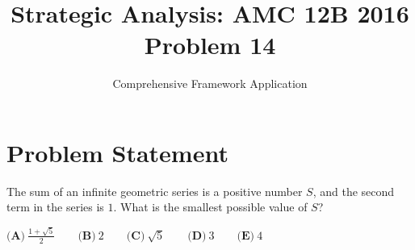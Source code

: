 \documentclass[12pt]{article}
\title{Strategic Analysis: AMC 12B 2016 Problem 14}
\author{Comprehensive Framework Application}
\date{}
\begin{document}
\maketitle

\section*{Problem Statement}
The sum of an infinite geometric series is a positive number $S$, and the second term in the series is $1$. What is the smallest possible value of $S$?

\begin{center}
$\textbf{(A)}\ \frac{1+\sqrt{5}}{2} \qquad \textbf{(B)}\ 2 \qquad \textbf{(C)}\ \sqrt{5} \qquad \textbf{(D)}\ 3 \qquad \textbf{(E)}\ 4$
\end{center}
\end{document}
